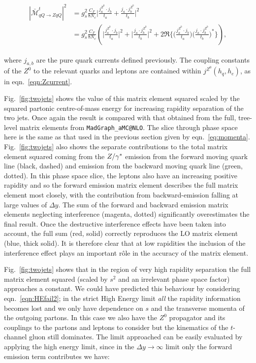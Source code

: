 		\begin{align}
		\begin{split}
			{|\bar{\mathcal{M}}_{qQ\to ZqQ}^{t}|}^2 &= g_s^2 \frac{C_F}{8N_c}
			\Big|\frac{j^{Z^0}_a\cdot j_b}{t_a} + \frac{j_a\cdot
			j^{Z^0}_b}{t_b}\Big|^2\\
			&= g_s^2 \frac{C_F}{8N_c} \left( \Big|\frac{j^{Z^0}_a\cdot j_b}{t_a}\Big|^2 + \Big|\frac{j_a\cdot
			j^{Z^0}_b}{t_b}\Big|^2 + 2\Re{\Big\{\Big(\frac{j^{Z^0}_a\cdot
			j_b}{t_a}\Big)\Big(\frac{j_a\cdot j^{Z^0}_b}{t_b}\Big)^*\Big\}} \right),
			\label{eqn:interference}
		\end{split}
		\end{align}

		where $j_{a,b}$ are the pure quark currents defined previously.  The
		coupling constants of the $Z^0$ to the relevant quarks and leptons are contained
		within $j^{Z^0}(h_q,h_e)$, as in eqn.~\eqref{eqn:Zcurrent}.

		Fig.~\eqref{fig:twojets} shows the value of this matrix element squared scaled by the squared partonic
		centre-of-mass energy for increasing rapidity separation of the two jets. Once again the
		result is compared with that obtained from the full, tree-level matrix elements from
		\texttt{MadGraph\_aMC@NLO}.  The slice through phase space here is the same as that used in the
		previous section given by eqn.~\eqref{eq:momenta}.  Fig.~\eqref{fig:twojets} also
		shows the separate contributions to the total matrix element squared coming from the
		$Z/\gamma^*$ emission from the forward moving quark line (black, dashed) and emission
		from the backward moving quark line (green, dotted).  In this phase space slice,
		the leptons also have an increasing positive rapidity and so the forward emission
		matrix element describes the full matrix element most closely, with the contribution
		from backward-emission falling at large values of $\Delta y$.  The sum of the forward
		and backward emission matrix elements neglecting interference (magenta, dotted)
		significantly overestimates the final result.  Once the destructive interference
		effects have been taken into account, the full sum (red, solid) correctly reproduces
		the LO matrix element (blue, thick solid).  It is therefore clear that at low
		rapidities the inclusion of the interference effect plays an important r\^ole in
		the accuracy of the matrix element.

		Fig.~\eqref{fig:twojets} shows that in the region of very high rapidity separation
		the full matrix element squared (scaled by $s^2$ and an irrelevant phase space factor)
		approaches a constant.  We could have predicted this behaviour by considering
		eqn.~\eqref{eqn:HEfail2}; in the strict High Energy limit \emph{all} the rapidity
		information becomes lost and we only have dependence on $s$ and the transverse
		momenta of the outgoing partons.  In this case we also have the $Z^0$ propagator
		and its couplings to the partons and leptons to consider but the kinematics of the
		$t$-channel gluon still dominates.  The limit approached can be easily evaluated
		by applying the high energy limit, since in the $\Delta y\to\infty$ limit only
		the forward emission term contributes we have:

